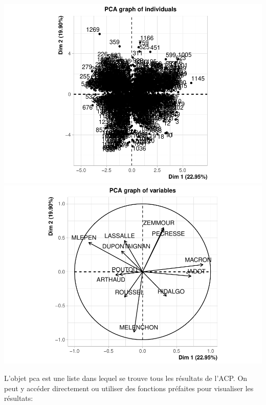 \documentclass[
]{book}
\begin{document}
\includegraphics{bookdown-demo_files/figure-latex/unnamed-chunk-57-1.pdf} \includegraphics{bookdown-demo_files/figure-latex/unnamed-chunk-57-2.pdf}

L'objet pca est une liste dans lequel se trouve tous les résultats de l'ACP. On peut y accéder directement ou utiliser des fonctions préfaites pour visualiser les résultats:
\end{document}
